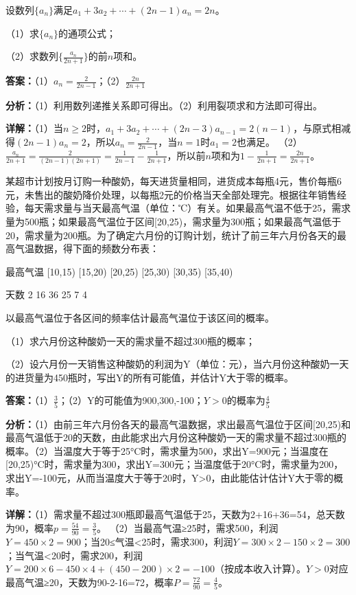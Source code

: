 \begin{question}[points=12]
设数列$\{a_n\}$满足$a_1+3a_2+\cdots+(2n-1)a_n=2n$。

（1）求$\{a_n\}$的通项公式；

（2）求数列$\{\frac{a_n}{2n+1}\}$的前$n$项和。
\begin{solution}
\textbf{答案：}（1）$a_n=\frac{2}{2n-1}$；（2）$\frac{2n}{2n+1}$

\textbf{分析：}（1）利用数列递推关系即可得出。（2）利用裂项求和方法即可得出。

\textbf{详解：}（1）当$n\ge 2$时，$a_1+3a_2+\cdots+(2n-3)a_{n-1}=2(n-1)$，与原式相减得$(2n-1)a_n=2$，所以$a_n=\frac{2}{2n-1}$，当$n=1$时$a_1=2$也满足。
（2）$\frac{a_n}{2n+1}=\frac{2}{(2n-1)(2n+1)}=\frac{1}{2n-1}-\frac{1}{2n+1}$，所以前$n$项和为$1-\frac{1}{2n+1}=\frac{2n}{2n+1}$。
\end{solution}
\end{question}

\begin{question}[points=12]
某超市计划按月订购一种酸奶，每天进货量相同，进货成本每瓶4元，售价每瓶6元，未售出的酸奶降价处理，以每瓶2元的价格当天全部处理完。根据往年销售经验，每天需求量与当天最高气温（单位：℃）有关。如果最高气温不低于25，需求量为500瓶；如果最高气温位于区间[20,25)，需求量为300瓶；如果最高气温低于20，需求量为200瓶。为了确定六月份的订购计划，统计了前三年六月份各天的最高气温数据，得下面的频数分布表：



最高气温  [10,15)  [15,20)  [20,25)  [25,30)  [30,35)  [35,40)

天数       2        16       36       25       7        4



以最高气温位于各区间的频率估计最高气温位于该区间的概率。

（1）求六月份这种酸奶一天的需求量不超过300瓶的概率；

（2）设六月份一天销售这种酸奶的利润为Y（单位：元），当六月份这种酸奶一天的进货量为450瓶时，写出Y的所有可能值，并估计Y大于零的概率。
\begin{solution}
\textbf{答案：}（1）$\frac{3}{5}$；（2）Y的可能值为900,300,-100；$Y>0$的概率为$\frac{4}{5}$

\textbf{分析：}（1）由前三年六月份各天的最高气温数据，求出最高气温位于区间[20,25)和最高气温低于20的天数，由此能求出六月份这种酸奶一天的需求量不超过300瓶的概率。（2）当温度大于等于25°C时，需求量为500，求出Y=900元；当温度在[20,25)°C时，需求量为300，求出Y=300元；当温度低于20°C时，需求量为200，求出Y=-100元，从而当温度大于等于20时，Y>0，由此能估计估计Y大于零的概率。

\textbf{详解：}（1）需求量不超过300瓶即最高气温低于25，天数为2+16+36=54，总天数为90，概率$p=\frac{54}{90}=\frac{3}{5}$。
（2）当最高气温≥25时，需求500，利润$Y=450\times2=900$；当20≤气温<25时，需求300，利润$Y=300\times2-150\times2=300$；当气温<20时，需求200，利润$Y=200\times6-450\times4+(450-200)\times2=-100$（按成本收入计算）。$Y>0$对应最高气温≥20，天数为90-2-16=72，概率$P=\frac{72}{90}=\frac{4}{5}$。
\end{solution}
\end{question}

